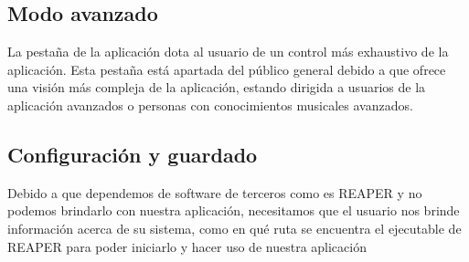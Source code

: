 \subsection{Modo avanzado}
La pestaña \advancedTabName{} de la aplicación dota al usuario de un control más exhaustivo de la aplicación. Esta pestaña está apartada del público general debido a que ofrece una visión más compleja de la aplicación, estando dirigida a usuarios de la aplicación avanzados o personas con conocimientos musicales avanzados.

\subsection{Configuración y guardado}
Debido a que dependemos de software de terceros como es REAPER y no podemos brindarlo con nuestra aplicación, necesitamos que el usuario nos brinde información acerca de su sistema, como en qué ruta se encuentra el ejecutable de REAPER para poder iniciarlo y hacer uso de nuestra aplicación
